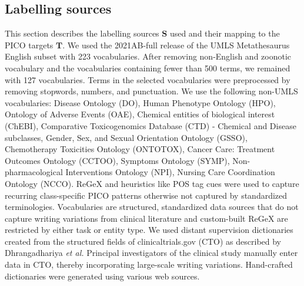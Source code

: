 \documentclass[10.7pt,]{article}
\begin{document}
\subsection{Labelling sources}\label{lss}
%
This section describes the labelling sources $\bm{S}$ used and their mapping to the PICO targets $\bm{T}$.
We used the 2021AB-full release of the UMLS Metathesaurus English subset with 223 vocabularies.
After removing non-English and zoonotic vocabulary and the vocabularies containing fewer than 500 terms, we remained with 127 vocabularies.\cite{humphreys1998unified}
Terms in the selected vocabularies were preprocessed by removing stopwords, numbers, and punctuation.
We use the following non-UMLS vocabularies: Disease Ontology (DO), Human Phenotype Ontology (HPO), Ontology of Adverse Events (OAE), Chemical entities of biological interest (ChEBI),  Comparative Toxicogenomics Database (CTD) - Chemical and Disease subclasses, Gender, Sex, and Sexual Orientation Ontology (GSSO), Chemotherapy Toxicities Ontology (ONTOTOX), Cancer Care: Treatment Outcomes Ontology (CCTOO), Symptoms Ontology (SYMP), Non-pharmacological Interventions Ontology (NPI), Nursing Care Coordination Ontology (NCCO).\cite{schriml2012disease,robinson2008human,he2014oae,de2010chemical,kronk2020development,geifman2011towards,rogier2021using,lin2018cancer,mohammed2012building,ninot2018definition}
ReGeX and heuristics like POS tag cues were used to capture recurring class-specific PICO patterns otherwise not captured by standardized terminologies.
Vocabularies are structured, standardized data sources that do not capture writing variations from clinical literature and custom-built ReGeX are restricted by either task or entity type.\cite{ratner2017snorkel,safranchik2020weakly}
We used distant supervision dictionaries created from the structured fields of clinicaltrials.gov (CTO) as described by Dhrangadhariya \textit{et al.}\cite{dhrangadhariya2022distant}
Principal investigators of the clinical study manually enter data in CTO, thereby incorporating large-scale writing variations.\cite{califf2012characteristics}
Hand-crafted dictionaries were generated using various web sources.
%
%
%
\end{document}
